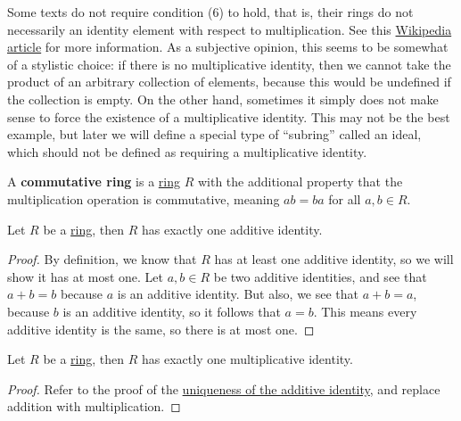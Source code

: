 \documentclass{scrartcl}
\begin{document}
Some texts do not require condition (6) to hold, that is, their rings do not necessarily an identity element with
respect to multiplication.
See this \href{https://en.wikipedia.org/wiki/Ring_(mathematics)#Notes_on_the_definition}{Wikipedia article} for more
information.
As a subjective opinion, this seems to be somewhat of a stylistic choice: if there is no multiplicative identity, then
we cannot take the product of an arbitrary collection of elements, because this would be undefined if the collection is
empty.
On the other hand, sometimes it simply does not make sense to force the existence of a multiplicative identity.
This may not be the best example, but later we will define a special type of ``subring'' called an ideal, which should
not be defined as requiring a multiplicative identity.

\begin{definition}
    \label{def:commutative ring}
    A \textbf{commutative ring} is a \hyperref[def:ring]{ring} $R$ with the additional property that the multiplication
    operation is commutative, meaning $ab=ba$ for all $a,b\in R$.
\end{definition}

\begin{proposition}
    \label{prop:unique additive identity}
    Let $R$ be a \hyperref[def:ring]{ring}, then $R$ has exactly one additive identity.
\end{proposition}

\begin{proof}
    By definition, we know that $R$ has at least one additive identity, so we will show it has at most one.
    Let $a,b\in R$ be two additive identities, and see that $a+b=b$ because $a$ is an additive identity.
    But also, we see that $a+b=a$, because $b$ is an additive identity, so it follows that $a=b$.
    This means every additive identity is the same, so there is at most one.
\end{proof}

\begin{proposition}
    \label{prop:unique multiplicative identity}
    Let $R$ be a \hyperref[def:ring]{ring}, then $R$ has exactly one multiplicative identity.
\end{proposition}

\begin{proof}
    Refer to the proof of the \hyperref[prop:unique additive identity]{uniqueness of the additive identity}, and
    replace addition with multiplication.
\end{proof}
\end{document}
